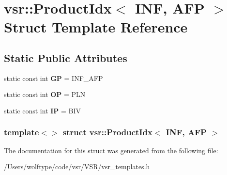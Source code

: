 \hypertarget{structvsr_1_1_product_idx_3_01_i_n_f_00_01_a_f_p_01_4}{\section{vsr\-:\-:Product\-Idx$<$ I\-N\-F, A\-F\-P $>$ Struct Template Reference}
\label{structvsr_1_1_product_idx_3_01_i_n_f_00_01_a_f_p_01_4}
}
\subsection*{Static Public Attributes}
\begin{DoxyCompactItemize}
\item 
\hypertarget{structvsr_1_1_product_idx_3_01_i_n_f_00_01_a_f_p_01_4_a701c7e1b3ee7cad2c3d28056967a93c1}{static const int {\bfseries G\-P} = I\-N\-F\-\_\-\-A\-F\-P}\label{structvsr_1_1_product_idx_3_01_i_n_f_00_01_a_f_p_01_4_a701c7e1b3ee7cad2c3d28056967a93c1}

\item 
\hypertarget{structvsr_1_1_product_idx_3_01_i_n_f_00_01_a_f_p_01_4_a4de5f7b5270eb179cc58e8ed32d56913}{static const int {\bfseries O\-P} = P\-L\-N}\label{structvsr_1_1_product_idx_3_01_i_n_f_00_01_a_f_p_01_4_a4de5f7b5270eb179cc58e8ed32d56913}

\item 
\hypertarget{structvsr_1_1_product_idx_3_01_i_n_f_00_01_a_f_p_01_4_adf52b348b8aa79104409062e9112ed93}{static const int {\bfseries I\-P} = B\-I\-V}\label{structvsr_1_1_product_idx_3_01_i_n_f_00_01_a_f_p_01_4_adf52b348b8aa79104409062e9112ed93}

\end{DoxyCompactItemize}
\subsubsection*{template$<$$>$ struct vsr\-::\-Product\-Idx$<$ I\-N\-F, A\-F\-P $>$}



The documentation for this struct was generated from the following file\-:\begin{DoxyCompactItemize}
\item 
/\-Users/wolftype/code/vsr/\-V\-S\-R/vsr\-\_\-templates.\-h\end{DoxyCompactItemize}
